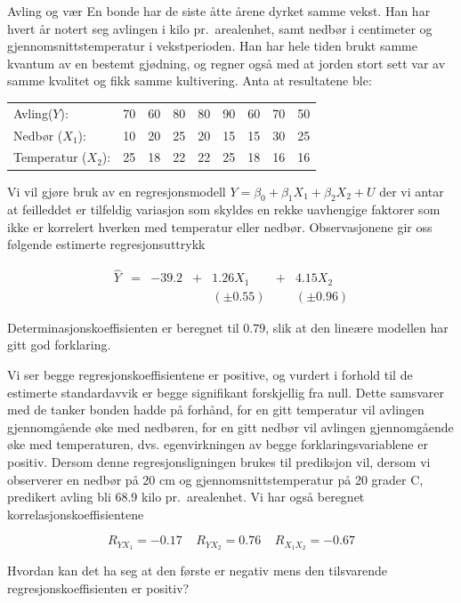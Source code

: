 \begin{eksempel}{Avling og vær}
En bonde har de siste åtte årene dyrket samme vekst.  Han har hvert
år notert seg avlingen i kilo pr.~arealenhet, samt nedbør i
centimeter og gjennomsnittstemperatur i vekstperioden.  Han har hele tiden
brukt samme kvantum av en bestemt gjødning, og regner også med at
jorden stort sett var av samme kvalitet og fikk samme kultivering.  Anta
at resultatene ble:

\begin{center}
 \begin{tabular}{lcccccccc}
Avling($Y$):        &  70  &  60  &  80  &  80  &  90  &  60  &  70 &  50 \\
Nedbør ($X_1$):  &  10  &  20  &  25  &  20  &  15  &  15  &  30 &  25 \\
Temperatur ($X_2$): &  25  &  18  &  22  &  22  &  25  &  18  &  16 &  16 \\
\end{tabular}
\end{center}

\noindent Vi vil gjøre bruk av en regresjonsmodell
 $ Y={\beta}_0 + {\beta}_1X_1+{\beta}_2X_2 + U $
 der vi antar at feilleddet er tilfeldig variasjon som
skyldes en rekke uavhengige faktorer som ikke er korrelert hverken med
temperatur eller nedbør.  Observasjonene gir oss følgende estimerte
regresjonsuttrykk 

\[  \begin{array}{ccccccc}
       \hat{Y}&=&-39.2&+&1.26X_1&+&4.15X_2       \\
              & &     & &(\pm 0.55)& &(\pm 0.96)
    \end{array} \]

\noindent Determinasjonskoeffisienten er beregnet til $0.79$, slik at den
 lineære modellen har gitt god forklaring.

Vi ser begge regresjonskoeffisientene er positive, og vurdert i forhold til
de estimerte standardavvik er begge signifikant forskjellig fra null.  Dette
samsvarer med de tanker bonden hadde på forhånd, for en gitt 
tempe\-ratur vil avlingen gjennomgående øke med nedbøren, for en gitt
nedbør vil avlingen gjennomgående øke med temperaturen,
dvs. egenvirkningen av begge forklaringsvariablene er positiv.  Dersom denne
regresjonsligningen brukes til prediksjon vil, dersom vi observerer en
nedbør på 20 cm og gjennomsnittstemperatur på 20 grader C, predikert
avling bli 68.9 kilo pr.~arealenhet.  Vi har også beregnet 
korrelasjonskoeffisientene

\[  R_{YX_1}=-0.17 \; \; \; \; R_{YX_2}=0.76  \; \;\; \;  R_{X_1X_2}=-0.67  \]

\noindent Hvordan kan det ha seg at den første er negativ mens den
 tilsvarende regresjonskoeffisienten er positiv?
\end{eksempel}

